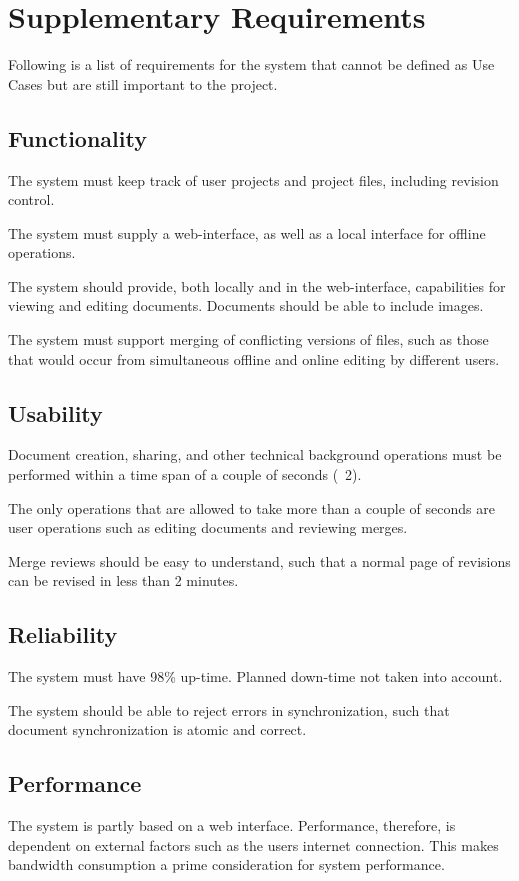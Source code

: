 \section{Supplementary Requirements}
\label{sec:Supplementary Requirements}

Following is a list of requirements for the system that cannot be defined as Use Cases %
but are still important to the project.

\subsection{Functionality}
The system must keep track of user projects and project files, including revision control.

The system must supply a web-interface, as well as a local interface for offline operations.

The system should provide, both locally and in the web-interface, capabilities for viewing and editing documents. Documents should be able to include images.

The system must support merging of conflicting versions of files, such as those that would occur from simultaneous offline and online editing by different users.

\subsection{Usability}
Document creation, sharing, and other technical background operations must be performed within a time span of a couple of seconds (~2).

The only operations that are allowed to take more than a couple of seconds are user operations such as editing documents and reviewing merges.

Merge reviews should be easy to understand, such that a normal page of revisions can be revised in less than 2 minutes.

\subsection{Reliability}
The system must have 98\% up-time. Planned down-time not taken into account.

The system should be able to reject errors in synchronization, such that document synchronization is atomic and correct.

\subsection{Performance}
The system is partly based on a web interface. Performance, therefore, is dependent on external factors such as the users internet connection.
This makes bandwidth consumption a prime consideration for system performance.

